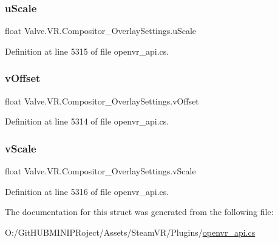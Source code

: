 \subsubsection{\texorpdfstring{uScale}{uScale}}
{\footnotesize\ttfamily float Valve.\+V\+R.\+Compositor\+\_\+\+Overlay\+Settings.\+u\+Scale}



Definition at line 5315 of file openvr\+\_\+api.\+cs.

\mbox{\label{struct_valve_1_1_v_r_1_1_compositor___overlay_settings_a27da175e903850a65ff7184405772f3c}} 
\subsubsection{\texorpdfstring{vOffset}{vOffset}}
{\footnotesize\ttfamily float Valve.\+V\+R.\+Compositor\+\_\+\+Overlay\+Settings.\+v\+Offset}



Definition at line 5314 of file openvr\+\_\+api.\+cs.

\mbox{\label{struct_valve_1_1_v_r_1_1_compositor___overlay_settings_acd180aed43547fdb737baa493fb6a485}} 
\subsubsection{\texorpdfstring{vScale}{vScale}}
{\footnotesize\ttfamily float Valve.\+V\+R.\+Compositor\+\_\+\+Overlay\+Settings.\+v\+Scale}



Definition at line 5316 of file openvr\+\_\+api.\+cs.



The documentation for this struct was generated from the following file\+:\begin{DoxyCompactItemize}
\item 
O\+:/\+Git\+H\+U\+B\+M\+I\+N\+I\+P\+Roject/\+Assets/\+Steam\+V\+R/\+Plugins/\mbox{\hyperlink{openvr__api_8cs}{openvr\+\_\+api.\+cs}}\end{DoxyCompactItemize}
